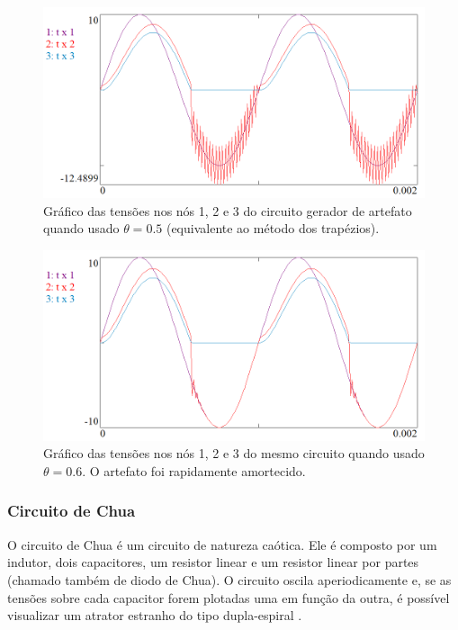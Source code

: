 \documentclass[11pt,titlepage]{article}
\begin{document}
\begin{figure}[!ht]
\centering
\includegraphics[scale=0.5]{graficos/artefato_trapezio.png}
\caption{Gráfico das tensões nos nós 1, 2 e 3 do circuito gerador de artefato quando usado $\theta = 0.5$ (equivalente ao método dos trapézios).}
\end{figure}

\begin{figure}[!ht]
\centering
\includegraphics[scale=0.5]{graficos/artefato_06.png}
\caption{Gráfico das tensões nos nós 1, 2 e 3 do mesmo circuito quando usado $\theta = 0.6$. O artefato foi rapidamente amortecido.}
\end{figure}


\subsubsection{Circuito de Chua}

O circuito de Chua é um circuito de natureza caótica. Ele é composto por um indutor, dois capacitores, um resistor linear e um resistor linear por partes (chamado também de \textquotedbl diodo de Chua\textquotedbl{}). O circuito oscila aperiodicamente e, se as tensões sobre cada capacitor forem plotadas uma em função da outra, é possível visualizar um atrator estranho do tipo dupla-espiral \cite{chaotic}.
\end{document}
